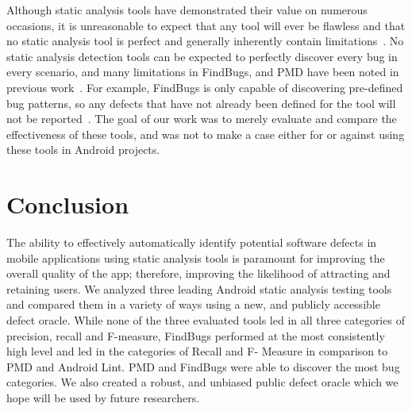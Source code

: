 \documentclass{sig-alternate}
\begin{document}


Although static analysis tools have demonstrated their value on numerous occasions, it is unreasonable to expect that any tool will ever be flawless and that no static analysis tool is perfect and generally inherently contain limitations~\cite{chess2004static}. No static analysis detection tools can be expected to perfectly discover every bug in every scenario, and many limitations in FindBugs, and PMD have been noted in previous work~\cite{Thung:2012:EWD:2351676.2351685}. For example, FindBugs is only capable of discovering pre-defined bug patterns, so any defects that have not already been defined for the tool will not be reported~\cite{FindBugs_URL}. The goal of our work was to merely evaluate and compare the effectiveness of these tools, and was not to make a case either for or against using these tools in Android projects.









\section{Conclusion}
\label{sec:conclusion}

The ability to effectively automatically identify potential software defects in mobile applications using static analysis tools is paramount for improving the overall quality of the app; therefore, improving the likelihood of attracting and retaining users. We analyzed three leading Android static analysis testing tools and compared them in a variety of ways using a new, and publicly accessible defect oracle. While none of the three evaluated tools led in all three categories of precision, recall and F-measure, FindBugs performed at the most consistently high level and led in the categories of Recall and F- Measure in comparison to PMD and Android Lint. PMD and FindBugs were able to discover the most bug categories. We also created a robust, and unbiased public defect oracle which we hope will be used by future researchers.
\end{document}
